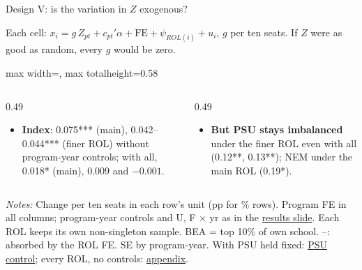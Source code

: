 \documentclass{beamer}
\begin{document}
\begin{frame}[label=d5-balance]{Design V: is the variation in $Z$ exogenous?}
{\scriptsize Each cell: $x_i = g\,Z_{pt} + c_{pt}'\alpha + \text{FE} + \psi_{ROL(i)} + u_i$, $g$ per ten seats. If $Z$ were as good as random, every $g$ would be zero.\par}
\vspace{0.02cm}
\centering
\begin{adjustbox}{max width=\textwidth, max totalheight=0.58\textheight}

\end{adjustbox}

\vspace{0.02cm}
\raggedright
\begin{columns}[T,onlytextwidth]
\begin{column}{0.49\textwidth}
\scriptsize
\begin{itemize}
    \setlength{\itemsep}{0pt}
    \item \textbf{Index}: 0.075*** (main), 0.042--0.044*** (finer ROL) without program-year controls; with all, 0.018* (main), 0.009 and $-0.001$.
\end{itemize}
\end{column}
\begin{column}{0.49\textwidth}
\scriptsize
\begin{itemize}
    \setlength{\itemsep}{0pt}
    \item \textbf{But PSU stays imbalanced} under the finer ROL even with all (0.12**, 0.13**); NEM under the main ROL (0.19*).
\end{itemize}
\end{column}
\end{columns}

\parbox{0.97\textwidth}{\tiny \textit{Notes:} Change per ten seats in each row's unit (pp for \% rows). Program FE in all columns; program-year controls and U, F $\times$ yr as in the \hyperlink{d5-results}{\color{blue}results slide}. Each ROL keeps its own non-singleton sample. BEA = top 10\% of own school. --: absorbed by the ROL FE. SE by program-year. With PSU held fixed: \hyperlink{d5-balance-psu}{\color{blue}PSU control}; every ROL, no controls: \hyperlink{d5-app-balance-rol}{\color{blue}appendix}.}
\end{frame}
\end{document}
